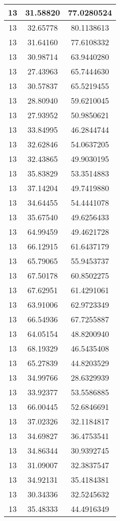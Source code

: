 \documentclass[
]{book}
\begin{document}
\begin{tabular}{c|c|c}
\hline
13 & 31.58820 & 77.0280524\\
\hline
13 & 32.65778 & 80.1138613\\
\hline
13 & 31.64160 & 77.6108332\\
\hline
13 & 30.98714 & 63.9440280\\
\hline
13 & 27.43963 & 65.7444630\\
\hline
13 & 30.57837 & 65.5219455\\
\hline
13 & 28.80940 & 59.6210045\\
\hline
13 & 27.93952 & 50.9850621\\
\hline
13 & 33.84995 & 46.2844744\\
\hline
13 & 32.62846 & 54.0637205\\
\hline
13 & 32.43865 & 49.9030195\\
\hline
13 & 35.83829 & 53.3514883\\
\hline
13 & 37.14204 & 49.7419880\\
\hline
13 & 34.64455 & 54.4441078\\
\hline
13 & 35.67540 & 49.6256433\\
\hline
13 & 64.99459 & 49.4621728\\
\hline
13 & 66.12915 & 61.6437179\\
\hline
13 & 65.79065 & 55.9453737\\
\hline
13 & 67.50178 & 60.8502275\\
\hline
13 & 67.62951 & 61.4291061\\
\hline
13 & 63.91006 & 62.9723349\\
\hline
13 & 66.54936 & 67.7255887\\
\hline
13 & 64.05154 & 48.8200940\\
\hline
13 & 68.19329 & 46.5435408\\
\hline
13 & 65.27839 & 44.8203529\\
\hline
13 & 34.99766 & 28.6329939\\
\hline
13 & 33.92377 & 53.5586885\\
\hline
13 & 66.00445 & 52.6846691\\
\hline
13 & 37.02326 & 32.1184817\\
\hline
13 & 34.69827 & 36.4753541\\
\hline
13 & 34.86344 & 30.9392745\\
\hline
13 & 31.09007 & 32.3837547\\
\hline
13 & 34.92131 & 35.4184381\\
\hline
13 & 30.34336 & 32.5245632\\
\hline
13 & 35.48333 & 44.4916349\\

\end{tabular}
\end{document}
